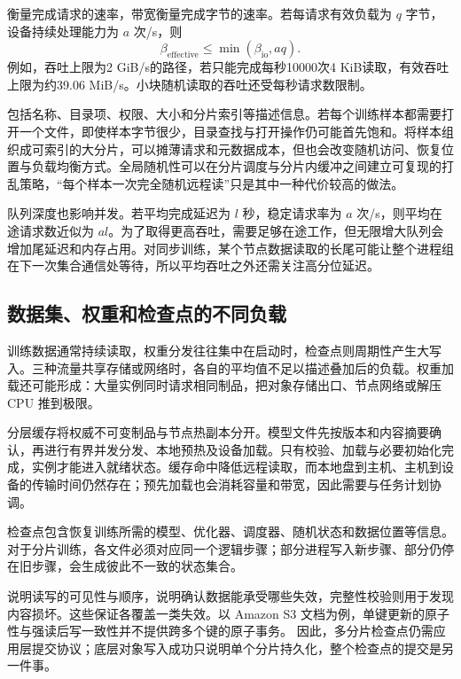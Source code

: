 \documentclass[../textbook.tex]{subfiles}
\begin{document}
衡量完成请求的速率，带宽衡量完成字节的速率。若每请求有效负载为 $q$ 字节，设备持续处理能力为 $a$ 次/s，则
\begin{equation}
 \beta_{\mathrm{effective}}\leq\min(\beta_{\mathrm{io}},aq).
 \label{eq:infra-iops}
\end{equation}
例如，吞吐上限为2 GiB/s的路径，若只能完成每秒10000次4 KiB读取，有效吞吐上限为约39.06 MiB/s。小块随机读取的吞吐还受每秒请求数限制。

包括名称、目录项、权限、大小和分片索引等描述信息。若每个训练样本都需要打开一个文件，即使样本字节很少，目录查找与打开操作仍可能首先饱和。将样本组织成可索引的大分片，可以摊薄请求和元数据成本，但也会改变随机访问、恢复位置与负载均衡方式。全局随机性可以在分片调度与分片内缓冲之间建立可复现的打乱策略，“每个样本一次完全随机远程读”只是其中一种代价较高的做法。

队列深度也影响并发。若平均完成延迟为 $l$ 秒，稳定请求率为 $a$ 次/s，则平均在途请求数近似为 $al$。为了取得更高吞吐，需要足够在途工作，但无限增大队列会增加尾延迟和内存占用。对同步训练，某个节点数据读取的长尾可能让整个进程组在下一次集合通信处等待，所以平均吞吐之外还需关注高分位延迟。

\subsection{数据集、权重和检查点的不同负载}
训练数据通常持续读取，权重分发往往集中在启动时，检查点则周期性产生大写入。三种流量共享存储或网络时，各自的平均值不足以描述叠加后的负载。权重加载还可能形成：大量实例同时请求相同制品，把对象存储出口、节点网络或解压 CPU 推到极限。

分层缓存将权威不可变制品与节点热副本分开。模型文件先按版本和内容摘要确认，再进行有界并发分发、本地预热及设备加载。只有校验、加载与必要初始化完成，实例才能进入就绪状态。缓存命中降低远程读取，而本地盘到主机、主机到设备的传输时间仍然存在；预先加载也会消耗容量和带宽，因此需要与任务计划协调。

检查点包含恢复训练所需的模型、优化器、调度器、随机状态和数据位置等信息。对于分片训练，各文件必须对应同一个逻辑步骤；部分进程写入新步骤、部分仍停在旧步骤，会生成彼此不一致的状态集合。

说明读写的可见性与顺序，说明确认数据能承受哪些失效，完整性校验则用于发现内容损坏。这些保证各覆盖一类失效。以 Amazon S3 文档为例，单键更新的原子性与强读后写一致性并不提供跨多个键的原子事务。\cite{aws2026s3consistency} 因此，多分片检查点仍需应用层提交协议；底层对象写入成功只说明单个分片持久化，整个检查点的提交是另一件事。
\end{document}
